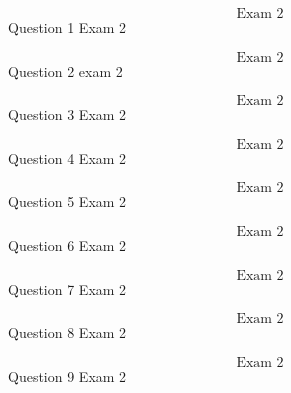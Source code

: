 \documentclass{article}
\begin{document}

    $$\text{Exam 2}$$
    Question 1 Exam 2
    \pagebreak

    $$\text{Exam 2}$$
    Question 2 exam 2
    \pagebreak

    $$\text{Exam 2}$$
    Question 3 Exam 2
    \pagebreak


    $$\text{Exam 2}$$
    Question 4 Exam 2
    \pagebreak


    $$\text{Exam 2}$$
    Question 5 Exam 2
    \pagebreak

    $$\text{Exam 2}$$
    Question 6 Exam 2
    \pagebreak

    $$\text{Exam 2}$$
    Question 7 Exam 2
    \pagebreak

    $$\text{Exam 2}$$
    Question 8 Exam 2
    \pagebreak

    $$\text{Exam 2}$$
    Question 9 Exam 2
    \pagebreak

\end{document}
